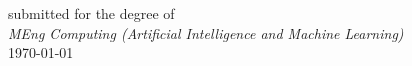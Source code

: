 \begin{titlepage}

{\large submitted for the degree of}\\[0.5cm] %
{\large \emph{MEng Computing (Artificial Intelligence and Machine Learning)}}\\[0.5cm]
{\large \today}\\[2cm] %

\vfill %

\end{titlepage}